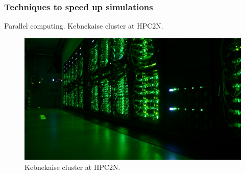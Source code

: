 \documentclass{beamer}
\begin{document}
\begin{frame}[fragile]\frametitle{Techniques to speed up simulations}

Parallel computing. Kebnekaise cluster at HPC2N.


\begin{figure} \includegraphics[scale=0.3]{kebnekaise.jpg}
\caption{{\scriptsize  Kebnekaise cluster at HPC2N. }} \end{figure}

\end{frame}
\end{document}
